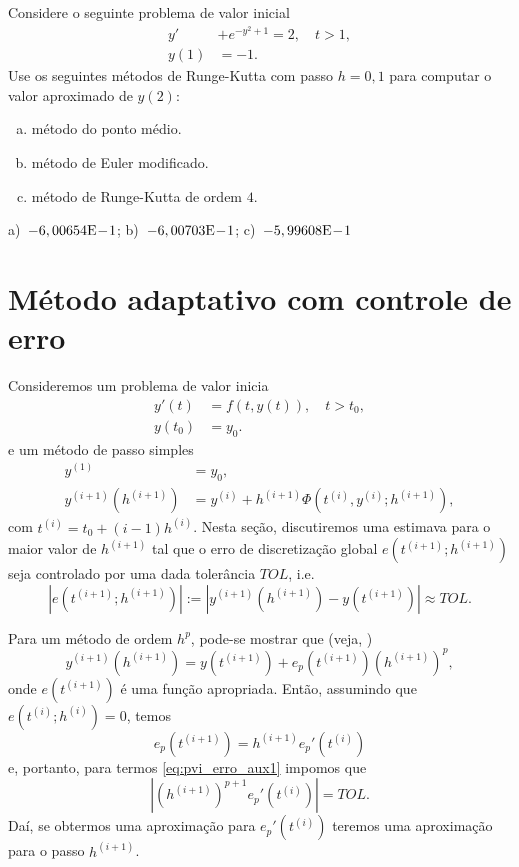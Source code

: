 \begin{exer}
  Considere o seguinte problema de valor inicial
  \begin{align}
    y' &+ e^{-y^2+1} = 2,\quad t>1,\\
    y(1) &= -1.
  \end{align}
Use os seguintes métodos de Runge-Kutta com passo $h=0,1$ para computar o valor aproximado de $y(2)$:
\begin{enumerate}[a)]
\item método do ponto médio.
\item método de Euler modificado.
\item método de Runge-Kutta de ordem $4$.
\end{enumerate}
\end{exer}
\begin{resp}
  a)~$-6,00654\mathrm{E}\!-\!1$; b)~$-6,00703\mathrm{E}\!-\!1$; c)~$-5,99608\mathrm{E}\!-\!1$
\end{resp}

\section{Método adaptativo com controle de erro}\label{cap_pvi_met_adap}

Consideremos um problema de valor inicia
\begin{align}
  y'(t) &= f(t,y(t)),\quad t>t_0,\\
  y(t_0) &= y_0.
\end{align}
e um método de passo simples
\begin{align}
  y^{(1)} &= y_0,\\
  y^{(i+1)}(h^{(i+1)}) &= y^{(i)} + h^{(i+1)}\Phi(t^{(i)},y^{(i)};h^{(i+1)}),
\end{align}
com $t^{(i)} = t_0 + (i-1)h^{(i)}$. Nesta seção, discutiremos uma estimava para o maior valor de $h^{(i+1)}$ tal que o erro de discretização global $e(t^{(i+1)};h^{(i+1)})$ seja controlado por uma dada tolerância $TOL$, i.e.
\begin{equation}\label{eq:pvi_erro_aux1}
  |e(t^{(i+1)};h^{(i+1)})| := |y^{(i+1)}(h^{(i+1)}) - y(t^{(i+1)})| \approx TOL.
\end{equation}

Para um método de ordem $h^p$, pode-se mostrar que (veja, \cite[Cap. 7, Seç. 7.2]{Isaacson1994a})
\begin{equation}\label{eq:pvi_erro_aux0}
  y^{(i+1)}(h^{(i+1)}) = y(t^{(i+1)}) + e_p(t^{(i+1)})(h^{(i+1)})^p,
\end{equation}
onde $e(t^{(i+1)})$ é uma função apropriada. Então, assumindo que $e(t^{(i)};h^{(i)})=0$, temos
\begin{equation}\label{eq:pvi_erro_aux2}
  e_p(t^{(i+1)}) = h^{(i+1)}e_p'(t^{(i)})
\end{equation}
e, portanto, para termos \eqref{eq:pvi_erro_aux1} impomos que
\begin{equation}\label{eq:pvi_erro_aux4}
  |(h^{(i+1)})^{p+1}e_p'(t^{(i)})| = TOL.
\end{equation}
Daí, se obtermos uma aproximação para $e_p'(t^{(i)})$ teremos uma aproximação para o passo $h^{(i+1)}$.

